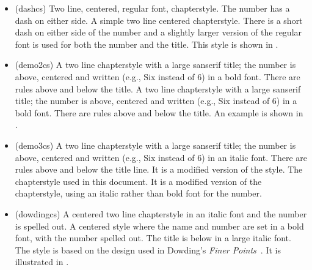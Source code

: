 \begin{itemize}
\item[\cstyle{dash}]
\glossary(dashcs)%
  {}%
  {Two line, centered, regular font, chapterstyle. The number has a dash on
   either side.}
 A simple two line centered chapterstyle. There is a short
dash on either side of the number and a slightly larger
version of the regular font is used for both the number and the title.
This style is shown in .



\item[\cstyle{demo2}]
\glossary(demo2cs)%
  {}%
  {A two line chapterstyle with a large sanserif title; the number is above,
   centered and written (e.g., Six instead of 6) in a bold font.
   There are rules above and below the title.}
   A two line chapterstyle with a large sanserif title; the number is above,
   centered and written (e.g., Six instead of 6) in a bold font.
   There are rules above and below the title. An example is shown in
  .



\item[\cstyle{demo3}]
\glossary(demo3cs)%
  {}%
  {A two line chapterstyle with a large sanserif title; the number is above,
   centered and written (e.g., Six instead of 6) in an italic font.
   There are rules above and below
   the title line. It is a modified version of the  style.}
   The chapterstyle used in this document. It is a
  modified version of the  chapterstyle, using an italic
  rather than bold font for the number.

\item[\cstyle{dowding}]
\glossary(dowdingcs)%
  {}%
  { A centered two line chapterstyle in an italic font and the number
   is spelled out.}
A centered style where the name and number are set in a bold font, with the
number spelled out. The title is below in a large italic font. The style
is based on the design used in Dowding's \textit{Finer Points}~\cite{DOWDING96}.
It is illustrated in
.


\end{itemize}
